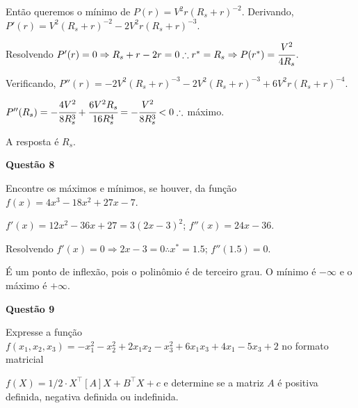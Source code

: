 \documentclass{rbfin}
\begin{document}
Então queremos o mínimo de $P(r) = V^2r(R_s + r)^{-2}$. Derivando, $P'(r) = V^2(R_s + r)^{-2} - 2V^2r(R_s + r)^{-3}$.

Resolvendo $P'(r) = 0 \Rightarrow R_s + r - 2r = 0 \therefore r^* = R_s \Rightarrow P(r^*) = \cfrac{V^2}{4R_s}$.

Verificando, $P''(r) = -2V^2(R_s + r)^{-3} - 2V^2(R_s + r)^{-3} + 6V^2r(R_s + r)^{-4}$.

$P''(R_s) = -\cfrac{4V^2}{8R_s^3} + \cfrac{6V^2R_s}{16 R_s^4} = -\cfrac{V^2}{8R_s^3} < 0 \therefore$ máximo.

A resposta é $R_s$.

\singlespacing

\vspace{6mm}

\large

\textbf{Questão 8}

\normalsize

\vspace{6mm}

\doublespacing

Encontre os máximos e mínimos, se houver, da função $f(x) = 4x^3 -18x^2 + 27x -7$.

$f'(x) = 12x^2 - 36x + 27 = 3 (2 x - 3)^2$; $f''(x) = 24x - 36$.

Resolvendo $f'(x) = 0 \Rightarrow 2x - 3 = 0 \therefore x^* = 1.5$; $f''(1.5) = 0$.

É um ponto de inflexão, pois o polinômio é de terceiro grau. O mínimo é $- \infty$ e o máximo é $+ \infty$.

\singlespacing

\vspace{6mm}

\large

\textbf{Questão 9}

\normalsize

\vspace{6mm}

Expresse a função $f(x_1, x_2, x_3) = -x_1^2-x_2^2 + 2x_1x_2 - x_3^2 + 6x_1x_3 + 4x_1 -5x_3 + 2$
no formato matricial 

$f(X) = 1/2\cdot X^\top [A]X + B^\top X + c$ e determine se a matriz $A$ é positiva
definida, negativa definida ou indefinida.
\end{document}

